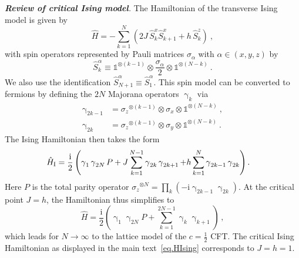 \documentclass[prl,a4paper,notitlepage,twocolumn,superscriptaddress,longbibliography,reprint]{revtex4-2}
\newcommand{\ii}{\mathrm{i}}
\newcommand{\id}{\mathbb{1}} %
\newcommand{\m}{\operatorname{\gamma}}
\newcommand{\mysection}[1]{{\vspace{10 pt}\noindent \emph{{\textbf{#1}}.}}}
\begin{document}

\mysection{Review of critical Ising model} The Hamiltonian of the transverse Ising model is given by
\begin{equation}\label{eq:TIsingHam}
\hat{H} = - \sum_{k=1}^N \left( 2 J\, \hat{S}^x_k \hat{S}^x_{k+1} + h\, \hat{S}^z_k \right) \ ,
\end{equation}
with spin operators represented by Pauli matrices $\sigma_\alpha$ with $\alpha \in (x,y,z)$ by 
\begin{equation}
\hat{S}^\alpha_k \equiv \id^{\otimes (k-1)} \otimes \frac{\sigma_\alpha}{2} \otimes \id^{\otimes (N-k)} \ .
\end{equation}
We also use the identification $\hat{S}^\alpha_{N+1} \equiv \hat{S}^\alpha_1$.
This spin model can be converted to fermions by defining the $2N$ Majorana operators $\m_k$ via
\begin{align}
\m_{2k-1} &= {\sigma_z}^{\otimes (k-1)} \otimes \sigma_x \otimes \id^{\otimes (N-k)} \ , \\
\m_{2k} &= {\sigma_z}^{\otimes (k-1)} \otimes \sigma_y \otimes \id^{\otimes (N-k)} \ .
\end{align}
The Ising Hamiltonian then takes the form
\small
\begin{equation}
\hspace{- 10 pt}\hat{H}_\text{I} = \frac{\ii}{2} \left( \m_1 \m_{2N} P + J \sum_{k=1}^{N-1} \m_{2k} \m_{2k+1} + h \sum_{k=1}^{N} \m_{2k-1} \m_{2k} \right) .
\end{equation}
\normalsize
Here $P$ is the total parity operator ${\sigma_z}^{\otimes N}=\prod_k (-\ii \m_{2k-1}\m_{2k})$.
At the critical point $J=h$, the Hamiltonian thus simplifies to
\begin{equation}
\hat{H} = \frac{\ii}{2} \left( \m_1 \m_{2N} P + \sum_{k=1}^{2N-1} \m_k \m_{k+1} \right)\,,
\end{equation}
which leads for $N\to\infty$ to the lattice model of the $c=\tfrac{1}{2}$ CFT. The critical Ising Hamiltonian as displayed in the main text~\eqref{eq.HIsing} 
corresponds to $J = h = 1$.
\end{document}
